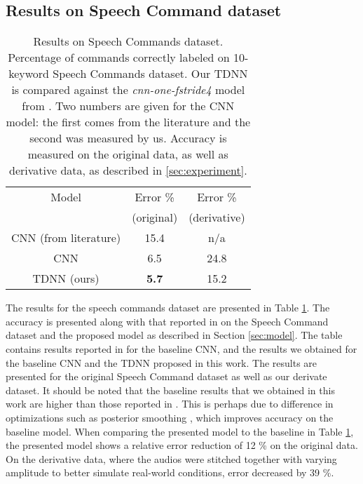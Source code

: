 \documentclass{article}
\begin{document}
\subsection{Results on Speech Command dataset}
\label{ssec:result_baseline}

\begin{table}[t]
	\begin{center}
		\begin{tabular}{|c|c|c| } 
			\hline
			Model & Error \% & Error \% \\ 
			& (original) & (derivative) \\ 
			\hline
			CNN (from literature) & 15.4 \cite{Zhang17} & n/a \\ 
			CNN & 6.5 & 24.8 \\ 
			TDNN (ours) & \textbf{5.7} & 15.2 \\ 
			\hline
		\end{tabular}
        \vspace{1em}
		\caption{Results on Speech Commands dataset. Percentage of commands correctly labeled on 10-keyword Speech Commands dataset.  Our TDNN is compared against the \textit{cnn-one-fstride4} model from \cite{Sainath15}. Two numbers are given for the CNN model: the first comes from the literature \cite{Zhang17} and the second was measured by us.  Accuracy is measured on the original data, as well as derivative data, as described in \ref{sec:experiment}. }
		\label{tab:baseline}
	\end{center}
\end{table}

The results for the speech commands dataset are presented in Table \ref{tab:baseline}. The accuracy is presented along with that reported in \cite{Zhang17} on the Speech Command dataset and the proposed model as described in Section \ref{sec:model}. The table contains results reported in \cite{Zhang17} for the baseline CNN, and the results we obtained for the baseline CNN and the TDNN proposed in this work. The results are presented for the original Speech Command dataset as well as our derivate dataset. It should be noted that the baseline results that we obtained in this work are higher than those reported in \cite{Zhang17}. This is perhaps due to difference in optimizations such as posterior smoothing \cite{Sainath15}, which improves accuracy on the baseline model. When comparing the presented model to the baseline in Table \ref{tab:baseline}, the presented model shows a relative error reduction of 12 \% on the original data.  On the derivative data, where the audios were stitched together with varying amplitude to better simulate real-world conditions, error decreased by 39 \%.
\end{document}
